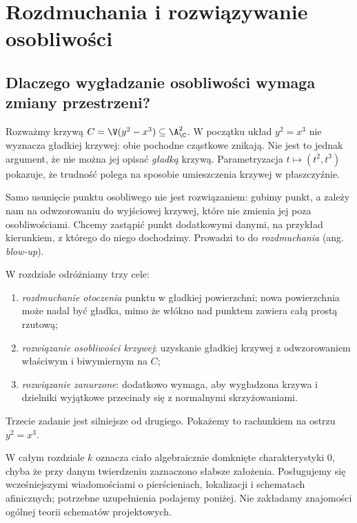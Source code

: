 \chapter{Rozdmuchania i rozwiązywanie osobliwości}
\label{ch:ga5-rozdmuchania}

\providecommand{\atlasref}[2]{#2}


\section{Dlaczego wygładzanie osobliwości wymaga zmiany przestrzeni?}
\label{sec:ga5-motywacja}

Rozważmy krzywą $C=\V(y^2-x^3)\subseteq\A^2_\C$. W początku układ
$y^2=x^3$ nie wyznacza gładkiej krzywej: obie pochodne cząstkowe
znikają. Nie jest to jednak argument, że nie można jej opisać
\emph{gładką} krzywą. Parametryzacja $t\mapsto(t^2,t^3)$ pokazuje, że
trudność polega na sposobie umieszczenia krzywej w płaszczyźnie.

Samo usunięcie punktu osobliwego nie jest rozwiązaniem: gubimy punkt,
a zależy nam na odwzorowaniu do wyjściowej krzywej, które nie zmienia
jej poza osobliwościami. Chcemy zastąpić punkt dodatkowymi danymi,
na przykład kierunkiem, z którego do niego dochodzimy. Prowadzi to
do \emph{rozdmuchania} (ang. \emph{blow-up}).

W rozdziale odróżniamy trzy cele:
\begin{enumerate}[label=\arabic*)]
\item \emph{rozdmuchanie otoczenia} punktu w gładkiej powierzchni;
      nowa powierzchnia może nadal być gładka, mimo że włókno nad
      punktem zawiera całą prostą rzutową;
\item \emph{rozwiązanie osobliwości krzywej}: uzyskanie gładkiej
      krzywej z odwzorowaniem właściwym i biwymiernym na $C$;
\item \emph{rozwiązanie zanurzone}: dodatkowo wymaga, aby wygładzona
      krzywa i dzielniki wyjątkowe przecinały się z normalnymi
      skrzyżowaniami.
\end{enumerate}
Trzecie zadanie jest silniejsze od drugiego. Pokażemy to rachunkiem
na ostrzu $y^2=x^3$.

W całym rozdziale $k$ oznacza ciało algebraicznie domknięte
charakterystyki $0$, chyba że przy danym twierdzeniu zaznaczono
słabsze założenia. Posługujemy się wcześniejszymi wiadomościami
o pierścieniach, lokalizacji i schematach afinicznych; potrzebne
uzupełnienia podajemy poniżej. Nie zakładamy znajomości ogólnej
teorii schematów projektowych.

